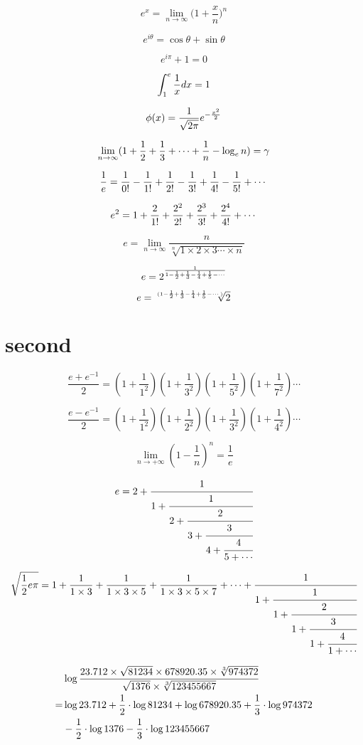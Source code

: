 $$ e^x = \lim_{n\rightarrow \infty} \big(1+\frac{x}{n}\big)^n $$

$$ e^{i\theta}  = \cos \theta + \sin \theta $$

$$ e^{i\pi} + 1 = 0 $$

$$  \int_1^e {1\over x} dx = 1 $$

$$  \phi(x) = {1 \over \sqrt{2\pi}} e^{-\frac{x^2}{2}} $$

$$ \lim_{n \rightarrow \infty} ( 1  + {1\over2} + {1\over3} + \cdots + {1\over n} - \log_e n ) =  \gamma  $$

$$ {1\over e} = {1 \over 0!}  - {1 \over 1!} + {1\over 2!} - {1\over 3!}  + {1\over 4!} -  {1\over 5!} + \cdots $$

$$ e^2 = 1 + {2 \over 1!} + {2^2\over 2!} + {2^3\over 3!} + {2^4\over 4!}  + \cdots $$

$$ e = \lim_{n \rightarrow \infty} \frac{n}{\sqrt[n]{1  \times 2  \times 3 \cdots \times n}} $$


$$ e = 2^{  \frac{1}{ 1- {1\over2} + {1\over3} - {1\over4}  + {1\over 5} - \cdots }  }  $$

$$ e = \sqrt[(1- {1\over2} + {1\over3} - {1\over4}  + {1\over 5} - \cdots) ]{2}  $$


\section{second}


$$  \frac{e+e^{-1}}{2} = (1+\frac{1}{1^2})(1+\frac{1}{3^2})(1+\frac{1}{5^2})(1+\frac{1}{7^2}) \cdots  $$

$$  \frac{e-e^{-1}}{2} = (1+\frac{1}{1^2})(1+\frac{1}{2^2})(1+\frac{1}{3^2})(1+\frac{1}{4^2}) \cdots  $$

$$ \lim_{n\rightarrow +\infty} (1-\frac{1}{n})^n  =  \frac{1}{e}  $$  

\begin{equation}
     e = 2+ \cfrac{1}{ 1 +
     \cfrac{1}{ 2 +
     \cfrac{2}{ 3 +
     \cfrac{3}{ 4 +
     \cfrac{4}{ 5 + \dotsb}}}}}
\end{equation}


$$  \sqrt{ {1\over2} e \pi}  = 1+{1 \over 1\times 3}  +{1 \over 1\times 3 \times 5} +  {1 \over 1\times 3 \times 5 \times 7} + \cdots +
\cfrac{1}{ 1 +
  \cfrac{1}{ 1 +
    \cfrac{2}{ 1 +
      \cfrac{3}{ 1 +
        \cfrac{4}{ 1 + \dotsb}}}}}
$$

\begin{align*}
& \log { 23.712  \times   \sqrt{81234}   \times  678920.35  \times  \sqrt[3]{974372}   
 \over {  \sqrt{1376}  \times   \sqrt[3]{123455667}  }}  \\
= & \log 23.712  +   \frac1 2 \cdot \log 81234   +  \log 678920.35  +  \frac 1 3 \cdot \log{974372} \\
& -  \frac 1 2 \cdot \log{1376}  -  \frac 1 3 \cdot \log {123455667} 
\end{align*}  


